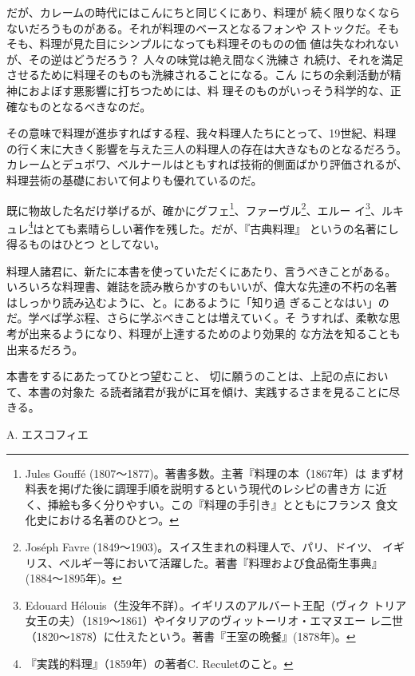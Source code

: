 だが、カレームの時代にはこんにちと同じくにあり、料理が
続く限りなくならないだろうものがある。それが料理のベースとなるフォンや
ストックだ。そもそも、料理が見た目にシンプルになっても料理そのものの価
値は失なわれないが、その逆はどうだろう？ 人々の味覚は絶え間なく洗練さ
れ続け、それを満足させるために料理そのものも洗練されることになる。こん
にちの余剰活動が精神におよぼす悪影響に打ちつためには、料
理そのものがいっそう科学的な、正確なものとなるべきなのだ。

その意味で料理が進歩すればする程、我々料理人たちにとって、19世紀、料理
の行く末に大きく影響を与えた三人の料理人の存在は大きなものとなるだろう。
カレームとデュボワ、ベルナールはともすれば技術的側面ばかり評価されるが、
料理芸術の基礎において何よりも優れているのだ。

既に物故した名だけ挙げるが、確かにグフェ\footnote{Jules Gouffé
  (1807〜1877)。著書多数。主著『料理の本（1867年）は
  まず材料表を掲げた後に調理手順を説明するという現代のレシピの書き方
  に近く、挿絵も多く分りやすい。この『料理の手引き』とともにフランス
  食文化史における名著のひとつ。}、ファーヴル\footnote{Joséph Favre
  (1849〜1903)。スイス生まれの料理人で、パリ、ドイツ、
  イギリス、ベルギー等において活躍した。著書『料理および食品衛生事典』
  (1884〜1895年)。}、エルー イ\footnote{Edouard
  Hélouis（生没年不詳）。イギリスのアルバート王配（ヴィク
  トリア女王の夫）（1819〜1861）やイタリアのヴィットーリオ・エマヌエー
  レ二世（1820〜1878）に仕えたという。著書『王室の晩餐』(1878年)。}、ルキュレ\footnote{『実践的料理』（1859年）の著者C.
  Reculetのこと。}はとても素晴らしい著作を残した。だが、『古典料理』
というの名著にし得るものはひとつ
としてない。

料理人諸君に、新たに本書を使っていただくにあたり、言うべきことがある。
いろいろな料理書、雑誌を読み散らかすのもいいが、偉大な先達の不朽の名著
はしっかり読み込むように、と。にあるように「知り過
ぎることなはい」のだ。学べば学ぶ程、さらに学ぶべきことは増えていく。そ
うすれば、柔軟な思考が出来るようになり、料理が上達するためのより効果的
な方法を知ることも出来るだろう。

本書をするにあたってひとつ望むこと、
切に願うのことは、上記の点において、本書の対象た
る読者諸君が我がに耳を傾け、実践するさまを見ることに尽
きる。\nopagebreak

\begin{flushright}
A. エスコフィエ \nopagebreak
\end{flushright}

